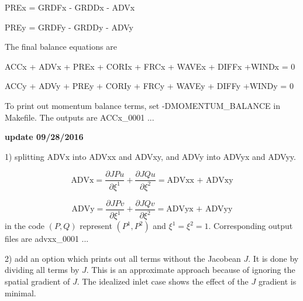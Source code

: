 \documentclass[11pt]{article}
\newcommand{\be}{\begin{equation}}
\newcommand{\ee}{\end{equation}}
\begin{document}
PREx = GRDFx - GRDDx - ADVx

PREy = GRDFy - GRDDy - ADVy

The final balance equations are


ACCx + ADVx + PREx + CORIx + FRCx  + WAVEx + DIFFx +WINDx = 0

ACCy + ADVy + PREy + CORIy + FRCy  + WAVEy + DIFFy +WINDy = 0

To print out momentum balance terms, set -DMOMENTUM\_BALANCE in Makefile. The outputs are ACCx\_0001 ...

{\bf update 09/28/2016}

1) splitting ADVx into ADVxx and ADVxy, and ADVy into ADVyx and ADVyy. 

\be
\mbox{ADVx} = \frac{\partial J P u}{\partial \xi^1} +  \frac{\partial J Q u}{\partial \xi^2}  = \mbox{ADVxx + ADVxy}
\ee

\be
\mbox{ADVy} = \frac{\partial J P v}{\partial \xi^1} +  \frac{\partial J Q v}{\partial \xi^2}  = \mbox{ADVyx + ADVyy}
\ee
in the code $(P, Q)$ represent $(P^1, P^2)$ and $\xi^1=\xi^2 = 1$.  Corresponding output files are advxx\_0001 ... 

2) add an option which prints out all terms without the Jacobean $J$. It is done by dividing all terms by $J$. This is an approximate approach because of ignoring the spatial gradient of $J$. The idealized inlet case shows the effect of the $J$ gradient is minimal.  
\end{document}
